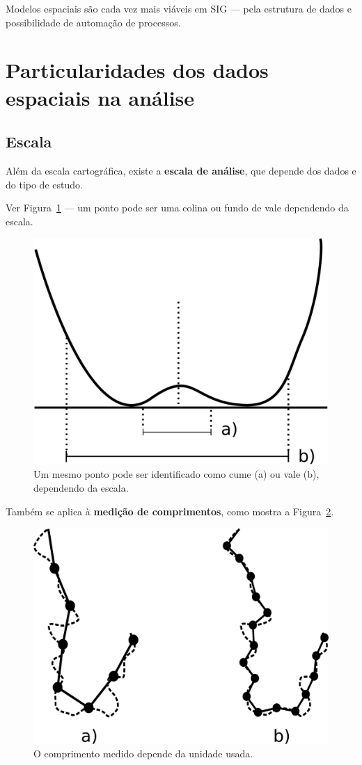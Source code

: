Modelos espaciais são cada vez mais viáveis em SIG — pela estrutura de dados e possibilidade de automação de processos.

\section{Particularidades dos dados espaciais na análise}

\subsection{Escala}

Além da escala cartográfica, existe a \textbf{escala de análise}, que depende dos dados e do tipo de estudo.

Ver Figura~\ref{Fig:Escalas_formas_terreno} — um ponto pode ser uma colina ou fundo de vale dependendo da escala.

\begin{figure}[h]   
\centering
\includegraphics[width= .45\columnwidth]{Analises/Escalas_formas_terreno.pdf}
\caption{\small Um mesmo ponto pode ser identificado como cume (a) ou vale (b), dependendo da escala.}
\label{Fig:Escalas_formas_terreno} 
\end{figure}

Também se aplica à \textbf{medição de comprimentos}, como mostra a Figura~\ref{Fig:Medida_linea_fractal}.

\begin{figure}[h]   
\centering
\includegraphics[width= .45\columnwidth]{Analises/Medida_linea_fractal.pdf}
\caption{\small O comprimento medido depende da unidade usada.}
\label{Fig:Medida_linea_fractal} 
\end{figure}

